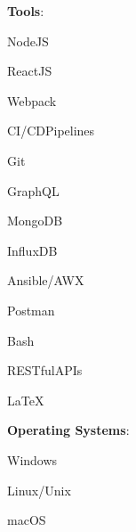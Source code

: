 \documentclass[showluaboxes=false]{resume}
\begin{document}
\begin{multicols}{3}
		\textbf{Tools}:\\%
			\begin{inlineseplist}
				\item NodeJS
				\item ReactJS
				\item Webpack
				\item CI/CD\;Pipelines
				\item Git
				\item GraphQL
				\item MongoDB
				\item InfluxDB
				\item Ansible/AWX
				\item Postman
				\item Bash
				\item RESTful\;APIs
				\item \LaTeX
			\end{inlineseplist}
		\columnbreak

		\textbf{Operating Systems}:\\
			\begin{inlineseplist}
				\item Windows
				\item Linux/Unix
				\item macOS
			\end{inlineseplist}
	\end{multicols}%
	\vspace*{0.25\baselineskip}
\end{document}
